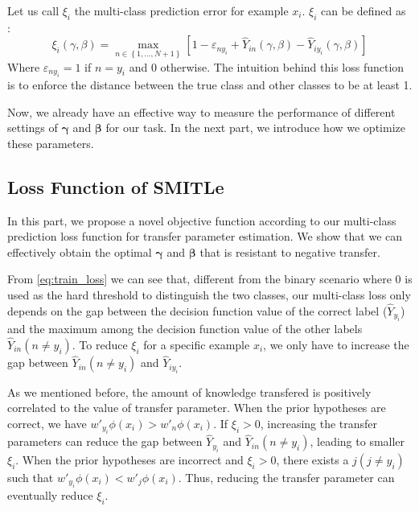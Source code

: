 Let us call $\xi_i$ the multi-class prediction error for example $x_i$. $\xi_i$ can be defined as \cite{crammer2002algorithmic}:
\begin{equation}\label{eq:train_loss}
\xi_i(\gamma,\beta) = \mathop {\max }\limits_{n \in \left\lbrace 1,...,N+1 \right\rbrace } {\left[ {1 - {\varepsilon _{n{y_i}}} + {{\hat Y}_{in}}\left( {\gamma ,\beta } \right) - {{\hat Y}_{i{y_i}}}\left( {\gamma ,\beta } \right)} \right]}
\end{equation}
Where $\varepsilon _{n{y_i}}=1$ if $n=y_i$ and 0 otherwise. The intuition behind this loss function is to enforce the distance between the true class and other classes to be at least 1. 

Now, we already have an effective way to measure the performance of different settings of $\boldsymbol{\gamma}$ and $\boldsymbol{\beta}$ for our task. In the next part, we introduce how we optimize these parameters.
\subsection{Loss Function of SMITLe}
In this part, we propose a novel objective function according to our multi-class prediction loss function for transfer parameter estimation. We show that we can effectively obtain the optimal $\boldsymbol{\gamma}$ and $\boldsymbol{\beta}$ that is resistant to negative transfer. 
 
From \eqref{eq:train_loss} we can see that, different from the binary scenario where 0 is used as the hard threshold to distinguish the two classes, our multi-class loss only depends on the gap between the decision function value of the correct label ($\hat Y_{y_i}$) and the maximum among the decision function value of the other labels ${{\hat Y}_{in}}(n \ne y_i)$. To reduce $\xi_i$ for a specific example $x_i$, we only have to increase the gap between ${{\hat Y}_{in}(n \ne y_i)}$ and ${{\hat Y}_{i{y_i}}}$. 

As we mentioned before, the amount of knowledge transfered is positively correlated to the value of transfer parameter. 
When the prior hypotheses are correct, we have $w'_{y_i}\phi ({x_i})> w'_{n}\phi ({x_i})$. If $\xi_i>0$, increasing the transfer parameters can reduce the gap between ${\hat Y_{y_i}}$ and ${{\hat Y}_{in}(n \ne y_i)}$, leading to smaller $\xi_i$. When the prior hypotheses are incorrect and $\xi_i>0$, there exists a $j(j\ne y_i)$ such that $w'_{y_i}\phi ({x_i})<w'_{j}\phi ({x_i})$. Thus, reducing the transfer parameter can eventually reduce $\xi_i$.

